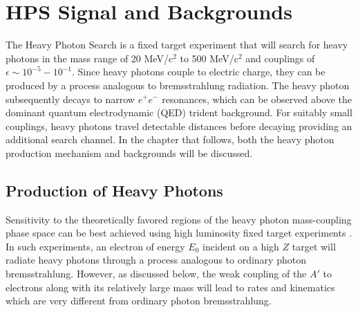 
\chapter{HPS Signal and Backgrounds}

The Heavy Photon Search is a fixed target experiment that will search for heavy
photons in the mass range of 20 MeV/c$^{2}$ to 500 MeV/c$^{2}$ and couplings
of $\epsilon \sim 10^{-5} - 10^{-1}$.  Since heavy photons couple to electric
charge, they can be produced by a process analogous to bremsstrahlung 
radiation.  The heavy photon subsequently decays to narrow $e^+e^-$ resonances, 
which can be observed above the dominant quantum electrodynamic (QED) trident
background.  For suitably small couplings, heavy photons travel detectable 
distances before decaying providing an additional search channel.  In the 
chapter that follows, both the heavy photon production mechanism and backgrounds
will be discussed.

\section{Production of Heavy Photons}

Sensitivity to the theoretically favored regions of the heavy photon 
mass-coupling phase space can be best achieved using high luminosity fixed
target experiments \cite{Bjorken:2009mm}.  In such experiments, an electron
of energy $E_{0}$ incident on a high $Z$ target will radiate heavy photons 
through a process analogous to ordinary photon bremsstrahlung. 
%
%
However, as discussed below, the weak coupling
of the $A'$ to electrons along with its relatively large mass will lead to 
rates and kinematics which are very different from ordinary photon 
bremsstrahlung.

